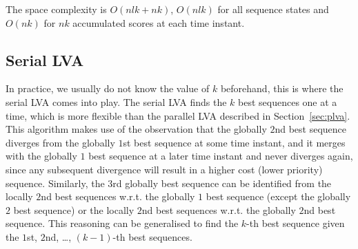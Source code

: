 The space complexity is $O ( nlk + nk )$, \ie $O(nlk)$ for all sequence states and $O(nk)$ for $nk$ accumulated scores at each time instant.


\subsection{Serial LVA}
\label{sec:slva}

In practice, we usually do not know the value of $k$ beforehand, this is where the serial LVA comes into play.
The serial LVA finds the $k$ best sequences one at a time, which is more flexible than the parallel LVA described in Section~\ref{sec:plva}.
This algorithm makes use of the observation that the globally $2$nd best sequence diverges from the globally $1$st best sequence 
at some time instant, and it merges with the globally $1$ best sequence at a later time instant and never diverges again, 
since any subsequent divergence will result in a higher cost (lower priority) sequence.
Similarly, the $3$rd globally best sequence can be identified from the locally $2$nd best sequences w.r.t. the globally $1$ best sequence 
(except the globally $2$ best sequence) or the locally $2$nd best sequences w.r.t. the globally $2$nd best sequence.
This reasoning can be generalised to find the $k$-th best sequence given the $1$st, $2$nd, \dots, $(k-1)$-th best sequences.

